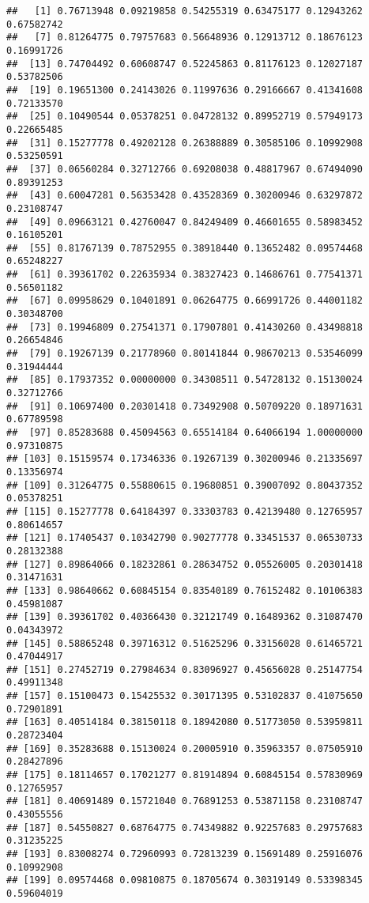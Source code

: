 \documentclass[
]{article}
\begin{document}
\begin{verbatim}
##   [1] 0.76713948 0.09219858 0.54255319 0.63475177 0.12943262 0.67582742
##   [7] 0.81264775 0.79757683 0.56648936 0.12913712 0.18676123 0.16991726
##  [13] 0.74704492 0.60608747 0.52245863 0.81176123 0.12027187 0.53782506
##  [19] 0.19651300 0.24143026 0.11997636 0.29166667 0.41341608 0.72133570
##  [25] 0.10490544 0.05378251 0.04728132 0.89952719 0.57949173 0.22665485
##  [31] 0.15277778 0.49202128 0.26388889 0.30585106 0.10992908 0.53250591
##  [37] 0.06560284 0.32712766 0.69208038 0.48817967 0.67494090 0.89391253
##  [43] 0.60047281 0.56353428 0.43528369 0.30200946 0.63297872 0.23108747
##  [49] 0.09663121 0.42760047 0.84249409 0.46601655 0.58983452 0.16105201
##  [55] 0.81767139 0.78752955 0.38918440 0.13652482 0.09574468 0.65248227
##  [61] 0.39361702 0.22635934 0.38327423 0.14686761 0.77541371 0.56501182
##  [67] 0.09958629 0.10401891 0.06264775 0.66991726 0.44001182 0.30348700
##  [73] 0.19946809 0.27541371 0.17907801 0.41430260 0.43498818 0.26654846
##  [79] 0.19267139 0.21778960 0.80141844 0.98670213 0.53546099 0.31944444
##  [85] 0.17937352 0.00000000 0.34308511 0.54728132 0.15130024 0.32712766
##  [91] 0.10697400 0.20301418 0.73492908 0.50709220 0.18971631 0.67789598
##  [97] 0.85283688 0.45094563 0.65514184 0.64066194 1.00000000 0.97310875
## [103] 0.15159574 0.17346336 0.19267139 0.30200946 0.21335697 0.13356974
## [109] 0.31264775 0.55880615 0.19680851 0.39007092 0.80437352 0.05378251
## [115] 0.15277778 0.64184397 0.33303783 0.42139480 0.12765957 0.80614657
## [121] 0.17405437 0.10342790 0.90277778 0.33451537 0.06530733 0.28132388
## [127] 0.89864066 0.18232861 0.28634752 0.05526005 0.20301418 0.31471631
## [133] 0.98640662 0.60845154 0.83540189 0.76152482 0.10106383 0.45981087
## [139] 0.39361702 0.40366430 0.32121749 0.16489362 0.31087470 0.04343972
## [145] 0.58865248 0.39716312 0.51625296 0.33156028 0.61465721 0.47044917
## [151] 0.27452719 0.27984634 0.83096927 0.45656028 0.25147754 0.49911348
## [157] 0.15100473 0.15425532 0.30171395 0.53102837 0.41075650 0.72901891
## [163] 0.40514184 0.38150118 0.18942080 0.51773050 0.53959811 0.28723404
## [169] 0.35283688 0.15130024 0.20005910 0.35963357 0.07505910 0.28427896
## [175] 0.18114657 0.17021277 0.81914894 0.60845154 0.57830969 0.12765957
## [181] 0.40691489 0.15721040 0.76891253 0.53871158 0.23108747 0.43055556
## [187] 0.54550827 0.68764775 0.74349882 0.92257683 0.29757683 0.31235225
## [193] 0.83008274 0.72960993 0.72813239 0.15691489 0.25916076 0.10992908
## [199] 0.09574468 0.09810875 0.18705674 0.30319149 0.53398345 0.59604019

\end{verbatim}
\end{document}

